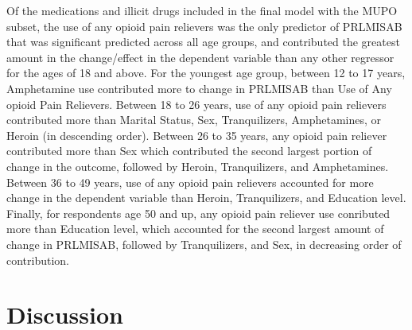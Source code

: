 \documentclass[sigconf]{acmart}
\begin{document}
Of the medications and illicit drugs included in the final model with the
MUPO subset, the use of any opioid pain relievers was the only predictor of
PRLMISAB that was significant predicted  across all age groups, and 
contributed the greatest amount in the change/effect in the dependent variable 
than any other regressor for the ages of 18 and above. For the youngest age
group, between 12 to 17 years, Amphetamine use contributed more to change in 
PRLMISAB than Use of Any opioid Pain Relievers. Between 18 to 26 years, use of
any opioid pain relievers contributed more than Marital Status, Sex, 
Tranquilizers, Amphetamines, or Heroin (in descending order). Between 26 to 35
years, any opioid pain reliever contributed more than Sex which contributed the 
second largest portion of change in the outcome, followed by Heroin, 
Tranquilizers, and Amphetamines. Between 36 to 49 years, use of any opioid pain 
relievers accounted for more change in the dependent variable than Heroin, 
Tranquilizers, and Education level. Finally, for respondents age 50 and up, 
any opioid pain reliever use conributed more than Education level, which 
accounted for the second largest amount of change in PRLMISAB, followed by 
Tranquilizers, and Sex, in decreasing order of contribution. 



\section{Discussion}
\end{document}
